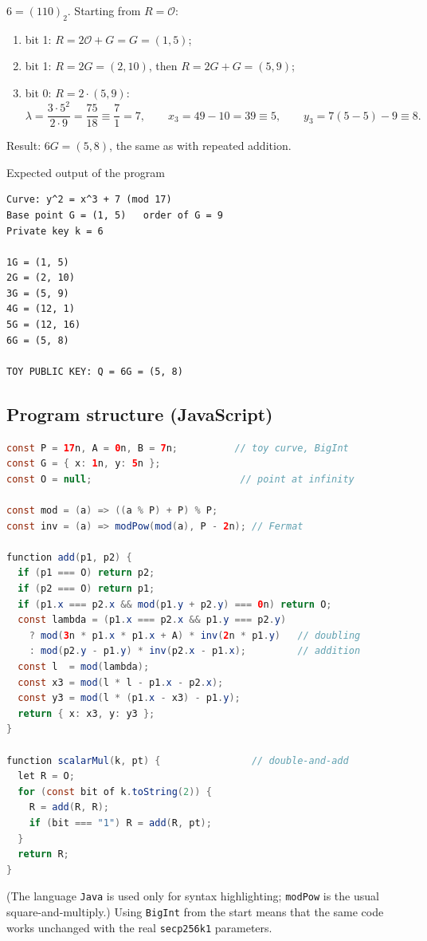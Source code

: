 $6 = (110)_2$. Starting from $R = \mathcal{O}$:
\begin{enumerate}
  \item bit 1: $R = 2\mathcal{O} + G = G = (1,5)$;
  \item bit 1: $R = 2G = (2,10)$, then $R = 2G + G = (5,9)$;
  \item bit 0: $R = 2 \cdot (5,9)$:
  \[
    \lambda = \frac{3 \cdot 5^2}{2 \cdot 9} = \frac{75}{18} \equiv \frac{7}{1} = 7, \qquad
    x_3 = 49 - 10 = 39 \equiv 5, \qquad
    y_3 = 7(5 - 5) - 9 \equiv 8 .
  \]
\end{enumerate}
Result: $6G = (5, 8)$, the same as with repeated addition. \checkmark

\begin{framedex}{Expected output of the program}
\begin{lstlisting}[numbers=none]
Curve: y^2 = x^3 + 7 (mod 17)
Base point G = (1, 5)   order of G = 9
Private key k = 6

1G = (1, 5)
2G = (2, 10)
3G = (5, 9)
4G = (12, 1)
5G = (12, 16)
6G = (5, 8)

TOY PUBLIC KEY: Q = 6G = (5, 8)\end{lstlisting}
\end{framedex}

\subsection{Program structure (JavaScript)}

\begin{lstlisting}[language=Java]
const P = 17n, A = 0n, B = 7n;          // toy curve, BigInt
const G = { x: 1n, y: 5n };
const O = null;                          // point at infinity

const mod = (a) => ((a % P) + P) % P;
const inv = (a) => modPow(mod(a), P - 2n); // Fermat

function add(p1, p2) {
  if (p1 === O) return p2;
  if (p2 === O) return p1;
  if (p1.x === p2.x && mod(p1.y + p2.y) === 0n) return O;
  const lambda = (p1.x === p2.x && p1.y === p2.y)
    ? mod(3n * p1.x * p1.x + A) * inv(2n * p1.y)   // doubling
    : mod(p2.y - p1.y) * inv(p2.x - p1.x);         // addition
  const l  = mod(lambda);
  const x3 = mod(l * l - p1.x - p2.x);
  const y3 = mod(l * (p1.x - x3) - p1.y);
  return { x: x3, y: y3 };
}

function scalarMul(k, pt) {                // double-and-add
  let R = O;
  for (const bit of k.toString(2)) {
    R = add(R, R);
    if (bit === "1") R = add(R, pt);
  }
  return R;
}\end{lstlisting}
(The language \texttt{Java} is used only for syntax highlighting; \texttt{modPow} is the usual square-and-multiply.) Using \texttt{BigInt} from the start means that the same code works unchanged with the real \texttt{secp256k1} parameters.

